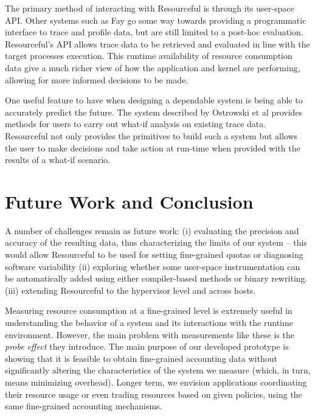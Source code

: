 \documentclass[letterpaper,twocolumn,10pt]{article}
\newcommand{\pname}{Resourceful}
\begin{document}
The primary method of interacting with \pname{} is through its user-space API.
Other systems such as Fay \cite{fay} go some way towards providing a programmatic
interface to trace and profile data, but are still limited to a post-hoc
evaluation. \pname{}'s API allows trace data to be retrieved and evaluated in
line with the target processes execution. This runtime availability of resource
consumption data give a much richer view of how the application and kernel are
performing, allowing for more informed decisions to be made. 

One useful feature to have when designing a dependable system is being able to
accurately predict the future. The system described by Ostrowski et al
\cite{ostrowski} provides methods for users to carry out what-if analysis on
existing trace data. \pname{} not only provides the primitives to build such a
system but allows the user to make decisions and take action at run-time when
provided with the results of a what-if scenario.




\section{Future Work and Conclusion} 
A number of challenges remain as future work: (i) evaluating the precision and
accuracy of the resulting data, thus characterizing the limits of our system -- this
would allow \pname{ }to be used for setting fine-grained quotas or diagnosing
software variability (ii) exploring whether some user-space instrumentation can
be automatically added using either compiler-based methods or binary rewriting.
(iii) extending \pname{ } to the hypervisor level and across hosts.

Measuring resource consumption at a fine-grained level is extremely useful in
understanding the behavior of a system and its interactions with the runtime
environment. However, the main problem with measurements like these is the
\emph{probe effect} they introduce. The main purpose of our developed prototype
is showing that it is feasible to obtain fine-grained accounting data without
significantly altering the characteristics of the system we measure (which, in
turn, means minimizing overhead). Longer term, we envision applications
coordinating their resource usage or even trading resources based on given
policies, using the same fine-grained accounting mechanisms.


{\footnotesize  }
\end{document}
